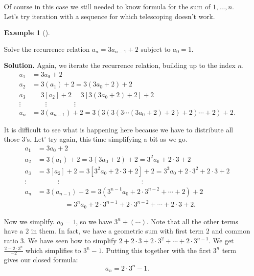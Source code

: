 \documentclass[10pt,]{book}
\theoremstyle{plain}
\theoremstyle{definition}
\newtheorem{example}[theorem]{Example}
\theoremstyle{definition}
\theoremstyle{definition}
\numberwithin{equation}{chapter}
\newcommand{\amp}{ & }
\begin{document}
Of course in this case we still needed to know formula for the sum of \(1,\ldots,n\). Let's try iteration with a sequence for which telescoping doesn't work.
%
\begin{example}[]\label{example-76}

Solve the recurrence relation \(a_n = 3a_{n-1} + 2\) subject to \(a_0 = 1\).
%
\par\medskip\noindent%
\textbf{Solution.}\quad
Again, we iterate the recurrence relation, building up to the index \(n\).
\begin{align*}
  a_1 \amp = 3a_0 + 2\\
  a_2 \amp = 3(a_1) + 2 = 3(3a_0 + 2) + 2\\
  a_3 \amp = 3[a_2] + 2 = 3[3(3a_0 + 2) + 2] + 2\\
  \vdots \amp  \qquad \vdots \qquad \qquad \vdots\\
  a_n \amp = 3(a_{n-1}) + 2 = 3(3(3(3\cdots(3a_0 + 2) + 2) + 2)\cdots + 2)+ 2.
\end{align*}
%
\par

It is difficult to see what is happening here because we have to distribute all those 3's. Let' try again, this time simplifying a bit as we go.
\begin{align*}
  a_1 \amp = 3a_0 + 2\\
  a_2 \amp = 3(a_1) + 2 = 3(3a_0 + 2) + 2 = 3^2a_0 + 2\cdot 3 + 2\\
  a_3 \amp = 3[a_2] + 2 = 3[3^2a_0 + 2\cdot 3 + 2] + 2 = 3^3 a_0 + 2 \cdot 3^2 + 2 \cdot 3 + 2\\
  \vdots \amp  \qquad\quad \vdots \hspace{2in} \vdots\\
  a_n \amp = 3(a_{n-1}) + 2 = 3(3^{n-1}a_0 + 2 \cdot 3^{n-2} + \cdots +2)+ 2\\
  \amp  \qquad \qquad = 3^n a_0 + 2\cdot 3^{n-1} + 2 \cdot 3^{n-2} + \cdots + 2\cdot 3 + 2.
\end{align*}
%
\par

Now we simplify. \(a_0 = 1\), so we have \(3^n + (\cdots)\). Note that all the other terms have a 2 in them. In fact, we have a geometric sum with first term \(2\) and common ratio \(3\). We have seen how to simplify \(2 + 2\cdot 3 + 2 \cdot 3^2 + \cdots + 2\cdot 3^{n-1}\). We get \(\frac{2-2\cdot 3^n}{-2}\) which simplifies to \(3^n - 1\). Putting this together with the first \(3^n\) term gives our closed formula:
\begin{equation*}
  a_n = 2\cdot 3^n - 1.
\end{equation*}
%
\end{example}
\par
\end{document}
